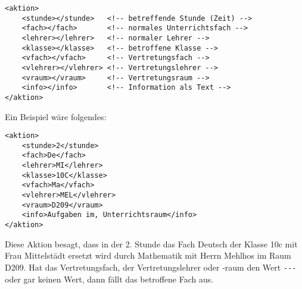 
\begin{lstlisting}
<aktion>
	<stunde></stunde>   <!-- betreffende Stunde (Zeit) -->
	<fach></fach>       <!-- normales Unterrichtsfach -->
	<lehrer></lehrer>   <!-- normaler Lehrer -->
	<klasse></klasse>   <!-- betroffene Klasse -->
	<vfach></vfach>     <!-- Vertretungsfach -->
	<vlehrer></vlehrer>	<!-- Vertretungslehrer -->
	<vraum></vraum>     <!-- Vertretungsraum -->
	<info></info>       <!-- Information als Text -->
</aktion>
\end{lstlisting}
Ein Beispiel wäre folgendes:

\begin{lstlisting}
<aktion>
	<stunde>2</stunde>
	<fach>De</fach>
	<lehrer>MI</lehrer>
	<klasse>10C</klasse>
	<vfach>Ma</vfach>
	<vlehrer>MEL</vlehrer>
	<vraum>D209</vraum>
	<info>Aufgaben im, Unterrichtsraum</info>
</aktion>
\end{lstlisting}
Diese Aktion besagt, dass in der 2. Stunde das Fach Deutsch der Klasse 10c mit Frau Mittelstädt ersetzt 
wird durch Mathematik mit Herrn Mehlhos im Raum D209. Hat das Vertretungsfach, der Vertretungslehrer oder
-raum den Wert \glqq\texttt{-{}-{}-}\grqq{} oder gar keinen Wert, dann fällt das betroffene Fach aus.


